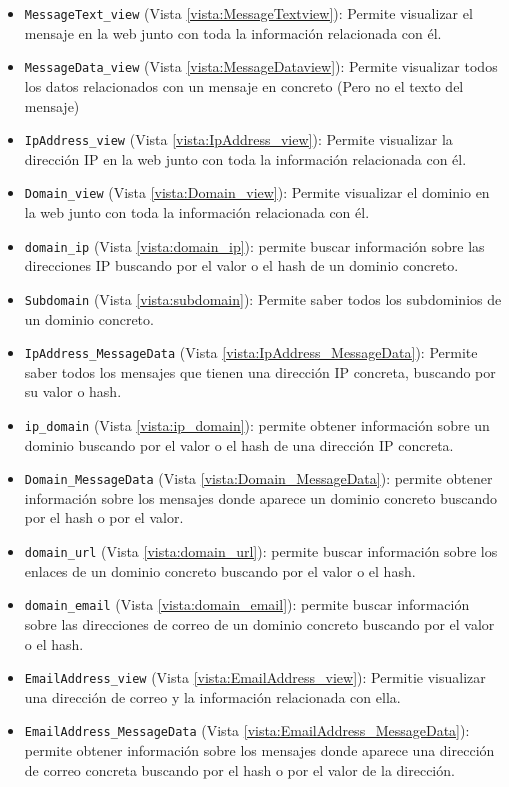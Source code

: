 \begin{itemize}
    \item \verb!MessageText_view! (Vista \ref{vista:MessageTextview}): Permite visualizar el mensaje en la web junto con toda la información relacionada con él.
    \item \verb!MessageData_view! (Vista \ref{vista:MessageDataview}): Permite visualizar todos los datos relacionados con un mensaje en concreto (Pero no el texto del mensaje)
    \item \verb!IpAddress_view! (Vista \ref{vista:IpAddress_view}): Permite visualizar la dirección IP en la web junto con toda la información relacionada con él. 
    \item \verb!Domain_view! (Vista \ref{vista:Domain_view}): Permite visualizar el dominio en la web junto con toda la información relacionada con él.
    \item \verb!domain_ip! (Vista \ref{vista:domain_ip}): permite buscar información sobre las direcciones IP buscando por el valor o el hash de un dominio concreto.  
    \item \verb!Subdomain! (Vista \ref{vista:subdomain}): Permite saber todos los subdominios de un dominio concreto.
    \item \verb!IpAddress_MessageData! (Vista \ref{vista:IpAddress_MessageData}): Permite saber todos los mensajes que tienen una dirección IP concreta, buscando por su valor o hash. 
    \item \verb!ip_domain! (Vista \ref{vista:ip_domain}): permite obtener información sobre un dominio buscando por el valor o el hash de una dirección IP concreta. 
    \item \verb!Domain_MessageData! (Vista \ref{vista:Domain_MessageData}):  permite obtener información sobre los mensajes donde aparece un dominio concreto buscando por el hash o por el valor. 
    \item \verb!domain_url! (Vista \ref{vista:domain_url}): permite buscar información sobre los enlaces de un dominio concreto buscando por el valor o el hash. 
    \item \verb!domain_email! (Vista \ref{vista:domain_email}): permite buscar información sobre las direcciones de correo de un dominio concreto buscando por el valor o el hash.
    \item \verb!EmailAddress_view! (Vista \ref{vista:EmailAddress_view}): Permitie visualizar una dirección de correo y la información relacionada con ella. 
    \item \verb!EmailAddress_MessageData! (Vista \ref{vista:EmailAddress_MessageData}): permite obtener información sobre los mensajes donde aparece una dirección de correo concreta buscando por el hash o por el valor de la dirección. 

\end{itemize}
